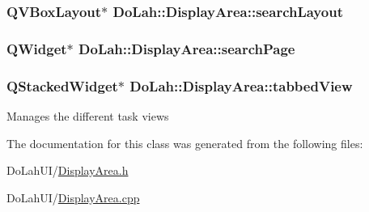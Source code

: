 \subsubsection[{search\+Layout}]{\setlength{\rightskip}{0pt plus 5cm}Q\+V\+Box\+Layout$\ast$ Do\+Lah\+::\+Display\+Area\+::search\+Layout}\label{class_do_lah_1_1_display_area_a9b549e5f86204024bb90bf1062f2e32b}
\hypertarget{class_do_lah_1_1_display_area_a43924eaffd8f850ee9cab55a848a1fb8}{}
\subsubsection[{search\+Page}]{\setlength{\rightskip}{0pt plus 5cm}Q\+Widget$\ast$ Do\+Lah\+::\+Display\+Area\+::search\+Page\hspace{0.3cm}{\ttfamily [private]}}\label{class_do_lah_1_1_display_area_a43924eaffd8f850ee9cab55a848a1fb8}
\hypertarget{class_do_lah_1_1_display_area_a35f9dbc424ce552bc50427d624f74321}{}
\subsubsection[{tabbed\+View}]{\setlength{\rightskip}{0pt plus 5cm}Q\+Stacked\+Widget$\ast$ Do\+Lah\+::\+Display\+Area\+::tabbed\+View}\label{class_do_lah_1_1_display_area_a35f9dbc424ce552bc50427d624f74321}
Manages the different task views 

The documentation for this class was generated from the following files\+:\begin{DoxyCompactItemize}
\item 
Do\+Lah\+U\+I/\hyperlink{_display_area_8h}{Display\+Area.\+h}\item 
Do\+Lah\+U\+I/\hyperlink{_display_area_8cpp}{Display\+Area.\+cpp}\end{DoxyCompactItemize}
